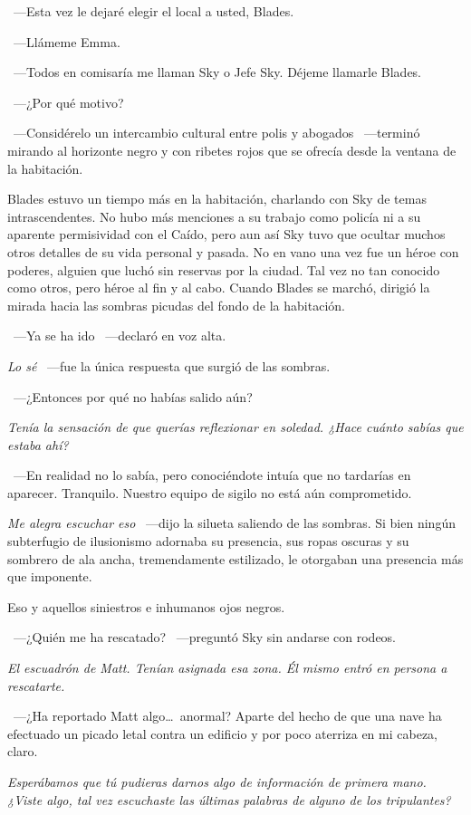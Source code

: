 ~---Esta vez le dejaré elegir el local a usted, Blades.

~---Llámeme Emma.

~---Todos en comisaría me llaman Sky o Jefe Sky. Déjeme llamarle Blades.

~---¿Por qué motivo?

~---Considérelo un intercambio cultural entre polis y abogados ~---terminó mirando al horizonte negro y con ribetes rojos que se ofrecía desde la ventana de la habitación.

\parbreak
Blades estuvo un tiempo más en la habitación, charlando con Sky de temas intrascendentes. No hubo más menciones a su trabajo como policía ni a su aparente permisividad con el Caído, pero aun así Sky tuvo que ocultar muchos otros detalles de su vida personal y pasada. No en vano una vez fue un héroe con poderes, alguien que luchó sin reservas por la ciudad. Tal vez no tan conocido como otros, pero héroe al fin y al cabo.
Cuando Blades se marchó, dirigió la mirada hacia las sombras picudas del fondo de la habitación.

~---Ya se ha ido ~---declaró en voz alta.

\emph{Lo sé} ~---fue la única respuesta que surgió de las sombras.

~---¿Entonces por qué no habías salido aún?

\emph{Tenía la sensación de que querías reflexionar en soledad. ¿Hace cuánto sabías que estaba ahí?}

~---En realidad no lo sabía, pero conociéndote intuía que no tardarías en aparecer. Tranquilo. Nuestro equipo de sigilo no está aún comprometido.

\emph{Me alegra escuchar eso} ~---dijo la silueta saliendo de las sombras. Si bien ningún subterfugio de ilusionismo adornaba su presencia, sus ropas oscuras y su sombrero de ala ancha, tremendamente estilizado, le otorgaban una presencia más que imponente.

Eso y aquellos siniestros e inhumanos ojos negros.

~---¿Quién me ha rescatado? ~---preguntó Sky sin andarse con rodeos.

\emph{El escuadrón de Matt. Tenían asignada esa zona. Él mismo entró en persona a rescatarte.}

~---¿Ha reportado Matt algo\dots\ anormal? Aparte del hecho de que una nave ha efectuado un picado letal contra un edificio y por poco aterriza en mi cabeza, claro.

\emph{Esperábamos que tú pudieras darnos algo de información de primera mano. ¿Viste algo, tal vez escuchaste las últimas palabras de alguno de los tripulantes?}

